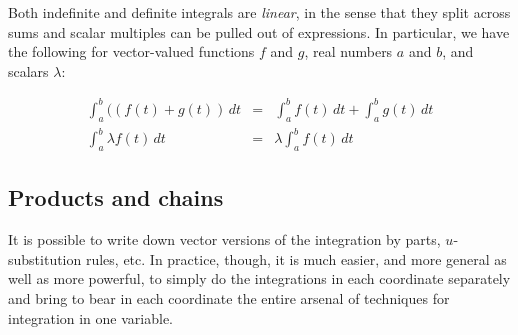 \documentclass[10pt]{amsart}
\begin{document}
Both indefinite and definite integrals are {\em linear}, in the sense
that they split across sums and scalar multiples can be pulled out of
expressions. In particular, we have the following for vector-valued
functions $f$ and $g$, real numbers $a$ and $b$, and scalars
$\lambda$:

\begin{eqnarray*}
  \int_a^b ((f(t) + g(t)) \, dt & = & \int_a^b f(t) \, dt + \int_a^b g(t) \, dt \\
  \int_a^b \lambda f(t) \, dt & = & \lambda \int_a^b f(t) \, dt
\end{eqnarray*}

\subsection{Products and chains}

It is possible to write down vector versions of the integration by
parts, $u$-substitution rules, etc. In practice, though, it is much
easier, and more general as well as more powerful, to simply do the
integrations in each coordinate separately and bring to bear in each
coordinate the entire arsenal of techniques for integration in one
variable.
\end{document}
